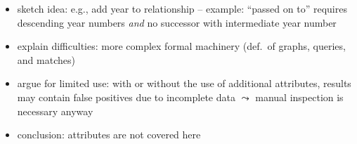 \begin{itemize}
  \item
    sketch idea: e.g., add year to relationship  -- example: \enquote{passed on to} requires descending year numbers \emph{and} no successor with intermediate year number
  \item
    explain difficulties: more complex formal machinery (def.\ of graphs, queries, and matches)
  \item
    argue for limited use: with or without the use of additional attributes, results may contain false positives due to incomplete data $\leadsto$ manual inspection is necessary anyway
  \item
    conclusion: attributes are not covered here
\end{itemize}

